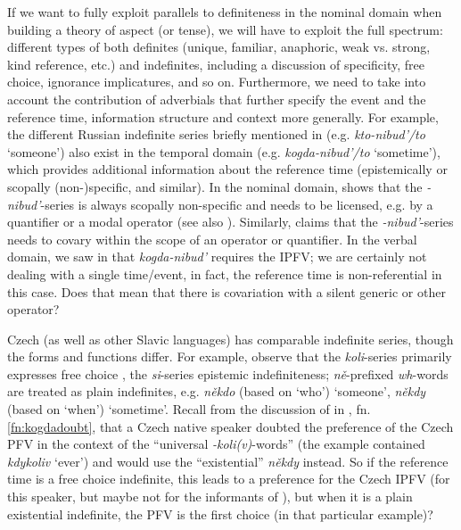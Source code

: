\documentclass[output=paper,colorlinks,citecolor=brown]{langscibook}
\begin{document}
If we want to fully exploit parallels to definiteness in the nominal domain when building a theory of aspect (or tense), we will have to exploit the full spectrum: different types of both definites (unique, familiar, anaphoric, weak vs. strong, kind reference, etc.) and indefinites, including a discussion of specificity, free choice, ignorance implicatures, and so on. Furthermore, we need to take into account the contribution of adverbials that further specify the event and the reference time, information structure and context more generally. For example, the different Russian indefinite series briefly mentioned in  (e.g. \textit{kto-nibud'/to} `someone')  also exist in the temporal domain (e.g. \textit{kogda-nibud'/to} `sometime'), which provides additional information about the reference time (epistemically or scopally (non-)specific, and similar). In the nominal domain, \citet{geist10a} shows that the \textit{-nibud'}-series is always scopally non-specific and needs to be licensed, e.g. by a quantifier or a modal operator (see also ). Similarly, \citet{pereltsvaignibud} claims that the \textit{-nibud'}-series needs to covary within the scope of an operator or quantifier. In the verbal domain, we saw in  that \textit{kogda-nibud'} requires the IPFV; we are certainly not dealing with a single time/event, in fact, the reference time is non-referential in this case. Does that mean that there is covariation with a silent generic or other operator?

Czech (as well as other Slavic languages) has comparable indefinite series, though the forms and functions differ. For example, \citet{aguilar+10} observe that the \textit{koli}-series primarily expresses free choice \citep[see also][]{aloni22}, the \textit{si}-series epistemic indefiniteness; \textit{ně}-prefixed \textit{wh}-words are treated as plain indefinites, e.g. \textit{někdo} (based on `who') `someone', \textit{někdy} (based on `when') `sometime'. Recall from the discussion of  in , fn. \ref{fn:kogdadoubt}, that a Czech native speaker doubted the preference of the Czech PFV in the context of the ``universal \textit{-koli(v)}-words'' (the example contained \textit{kdykoliv} `ever') and would use the ``existential'' \textit{někdy} instead. So if the reference time is a free choice indefinite, this leads to a preference for the Czech IPFV (for this speaker, but maybe not for the informants of \citealt{klimek22}), but when it is a plain existential indefinite, the PFV is the first choice (in that particular example)?
\end{document}
